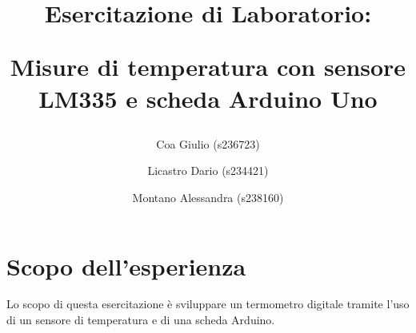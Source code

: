 \documentclass[a4paper]{article}
\title{
	\begin{center}
		Esercitazione di Laboratorio:
	\end{center}
	\newline
	\begin{center}
		Misure di temperatura con sensore LM335 e scheda Arduino Uno
	\end{center}
}
\author{
	Coa Giulio (s236723)
	\and
	Licastro Dario (s234421)
	\and
	Montano Alessandra (s238160)
}
\begin{document}
	\begin{titlingpage}
		\maketitle
	\end{titlingpage}
	\newpage
	\section{Scopo dell'esperienza}
		Lo scopo di questa esercitazione è sviluppare un termometro digitale tramite l'uso di un sensore di temperatura e di una scheda Arduino.
\end{document}
